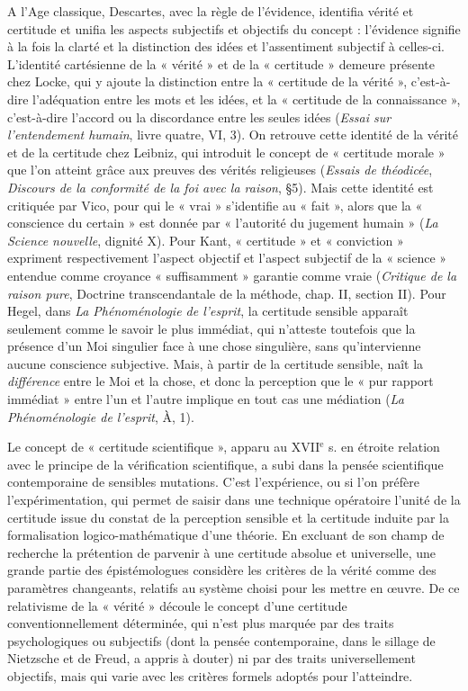 A l’Age classique, Descartes, avec la
règle de l’évidence, identifia vérité et certitude
et unifia les aspects subjectifs et
objectifs du concept : l’évidence signifie à
la fois la clarté et la distinction des idées
et l’assentiment subjectif à celles-ci.
L'identité cartésienne de la « vérité » et
de la « certitude » demeure présente chez
Locke, qui y ajoute la distinction entre la
« certitude de la vérité », c’est-à-dire
l’adéquation entre les mots et les idées, et
la « certitude de la connaissance », c’est-à-dire
l’accord ou la discordance entre les
seules idées ({\it Essai sur l’entendement
humain}, livre quatre, VI, 3). On retrouve
cette identité de la vérité et de la certitude
chez Leibniz, qui introduit le concept de
« certitude morale » que l’on atteint grâce
aux preuves des vérités religieuses ({\it Essais
de théodicée}, {\it Discours de la conformité de
la foi avec la raison}, \S 5). Mais cette identité
est critiquée par Vico, pour qui le
« vrai » s’identifie au « fait », alors que la
« conscience du certain » est donnée par
« l'autorité du jugement humain » ({\it La
Science nouvelle}, dignité X). Pour Kant,
« certitude » et « conviction » expriment
respectivement l’aspect objectif et l’aspect
subjectif de la « science » entendue
comme croyance « suffisamment » garantie
comme vraie ({\it Critique de la raison
%
pure}, Doctrine transcendantale de la
méthode, chap. II, section II). Pour
Hegel, dans {\it La Phénoménologie de l’esprit},
la certitude sensible apparaît seulement
comme le savoir le plus immédiat,
qui n’atteste toutefois que la présence
d’un Moi singulier face à une chose singulière,
sans qu’intervienne aucune
conscience subjective. Mais, à partir de la
certitude sensible, naît la {\it différence} entre
le Moi et la chose, et donc la perception
que le « pur rapport immédiat » entre l’un
et l’autre implique en tout cas une médiation
({\it La Phénoménologie de l'esprit}, À, 1).

Le concept de « certitude scientifique »,
apparu au {\footnotesize XVII}$^\text{e}$ s. en étroite relation avec le
principe de la vérification scientifique, a
subi dans la pensée scientifique contemporaine
de sensibles mutations. C’est l’expérience,
ou si l’on préfère l’expérimentation,
qui permet de saisir dans une technique
opératoire l’unité de la certitude issue du
constat de la perception sensible et la certitude
induite par la formalisation logico-mathématique
d’une théorie. En excluant
de son champ de recherche la prétention de
parvenir à une certitude absolue et universelle,
une grande partie des épistémologues
considère les critères de la vérité comme
des paramètres changeants, relatifs au système
choisi pour les mettre en œuvre. De
ce relativisme de la « vérité » découle le
concept d’une certitude conventionnellement
déterminée, qui n’est plus marquée
par des traits psychologiques ou subjectifs
(dont la pensée contemporaine, dans le sillage
de Nietzsche et de Freud, a appris à
douter) ni par des traits universellement
objectifs, mais qui varie avec les critères
formels adoptés pour l’atteindre.


 

 

